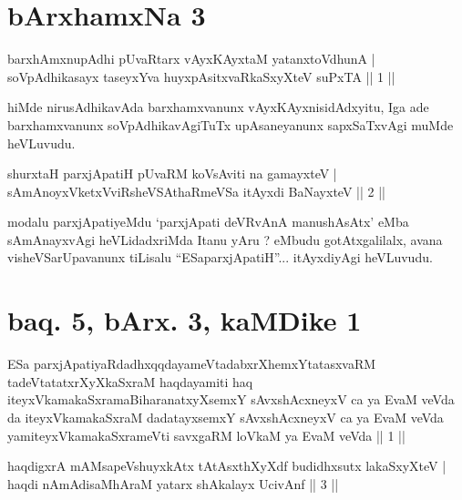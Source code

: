 
\section*{bArxhamxNa 3}

 \begin{shl}
barxhAmxnupAdhi pUvaRtarx vAyxKAyxtaM yatanxtoV\s dhunA | \\
soVpAdhikasayx taseyxYva huyxpAsitxvaRkaSxyXteV suPxTA \hfill ||  1 || 
\end{shl}

\begin{artha}
hiMde nirusAdhikavAda barxhamxvanunx vAyxKAyxnisidAdxyitu, Iga ade barxhamxvanunx soVpAdhikavAgiTuTx upAsaneyanunx sapxSaTxvAgi muMde heVLuvudu.
\end{artha}

\begin{shl}
shurxtaH parxjApatiH pUvaRM koV\s sAviti na gamayxteV | \\
sAmAnoyxVketxVviRsheVSAthaRmeVSa itAyxdi BaNayxteV \hfill ||  2 || 
\end{shl}	

\begin{artha}
modalu parxjApatiyeMdu `parxjApati deVRvAnA manushAsAtx' eMba sAmAnayxvAgi heVLidadxriMda Itanu yAru ? eMbudu gotAtxgalilalx, avana visheVSarUpavanunx tiLisalu ``ESaparxjApatiH''... itAyxdiyAgi heVLuvudu.
\end{artha}

\section*{baq. 5, bArx. 3, kaMDike 1}

\begin{shl}
ESa parxjApatiyaRdadhxqqdayameVtadabxrXhemxYtatasxvaRM tadeVtatatxrXyXkaSxraM haqdayamiti haq iteyxVkamakaSxramaBiharanatxyXsemxY sAvxshAcxneyxV ca ya EvaM veVda da iteyxVkamakaSxraM dadatayxsemxY sAvxshAcxneyxV ca ya EvaM veVda yamiteyxVkamakaSxrameVti savxgaRM loVkaM ya EvaM veVda || 1 ||
\end{shl}


\begin{shl}
haqdigxrA mAMsapeVshuyxkAtx tAtAsxthXyXdf budidhxsutx lakaSxyXteV | \\
haqdi nAmAdisaMhAraM yatarx shAkalayx UcivAnf \hfill ||  3 || 
\end{shl}

